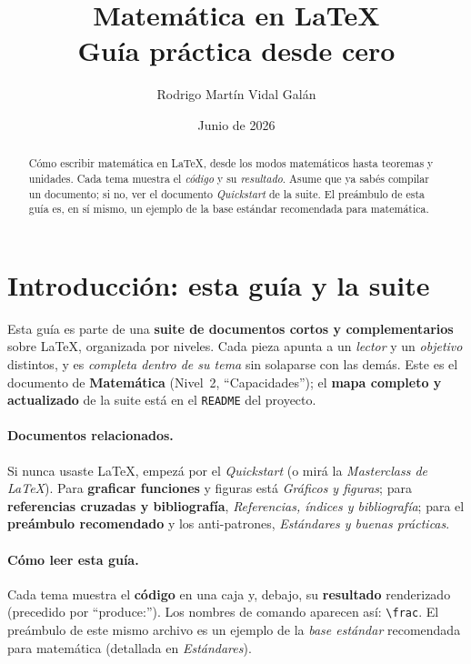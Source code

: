 \documentclass[11pt,a4paper]{article}
\title{\textbf{Matemática en \LaTeX}\\[2pt]\large Guía práctica desde cero}
\author{Rodrigo Martín Vidal Galán}
\date{Junio de 2026}
\newcommand{\C}[1]{\texttt{\textbackslash #1}}   %
\theoremstyle{plain}      %
\theoremstyle{definition} %
\theoremstyle{remark}
\begin{document}
\maketitle

\begin{abstract}
\noindent Cómo escribir matemática en \LaTeX, desde los modos matemáticos hasta
teoremas y unidades. Cada tema muestra el \emph{código} y su \emph{resultado}.
Asume que ya sabés compilar un documento; si no, ver el documento
\emph{Quickstart} de la suite. El preámbulo de esta guía es, en sí mismo, un
ejemplo de la base estándar recomendada para matemática.
\end{abstract}

\newpage
\tableofcontents
\newpage

\section{Introducción: esta guía y la suite}
Esta guía es parte de una \textbf{suite de documentos cortos y complementarios}
sobre \LaTeX, organizada por niveles. Cada pieza apunta a un \emph{lector} y un
\emph{objetivo} distintos, y es \emph{completa dentro de su tema} sin solaparse
con las demás. Este es el documento de \textbf{Matemática} (Nivel~2,
\enquote{Capacidades}); el \textbf{mapa completo y actualizado} de la suite está
en el \texttt{README} del proyecto.

\paragraph{Documentos relacionados.} Si nunca usaste \LaTeX, empezá por el
\emph{Quickstart} (o mirá la \emph{Masterclass de \LaTeX}). Para \textbf{graficar
funciones} y figuras está \emph{Gráficos y figuras}; para \textbf{referencias
cruzadas y bibliografía}, \emph{Referencias, índices y bibliografía}; para el
\textbf{preámbulo recomendado} y los anti-patrones, \emph{Estándares y buenas
prácticas}.

\paragraph{Cómo leer esta guía.} Cada tema muestra el \textbf{código} en una caja
y, debajo, su \textbf{resultado} renderizado (precedido por \enquote{produce:}).
Los nombres de comando aparecen así: \C{frac}. El preámbulo de este mismo archivo
es un ejemplo de la \emph{base estándar} recomendada para matemática (detallada
en \emph{Estándares}).
\end{document}
